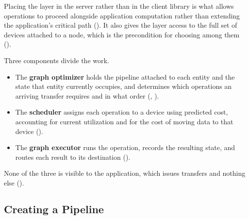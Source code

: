 Placing the layer in the server rather than in the client library is what allows operations to proceed alongside application computation rather than extending the application's critical path (). It also gives the layer access to the full set of devices attached to a node, which is the precondition for choosing among them ().

Three components divide the work.

\begin{itemize}
    \item The \textbf{graph optimizer} holds the pipeline attached to each entity and the state that entity currently occupies, and determines which operations an arriving transfer requires and in what order (, ).
    \item The \textbf{scheduler} assigns each operation to a device using predicted cost, accounting for current utilization and for the cost of moving data to that device ().
    \item The \textbf{graph executor} runs the operation, records the resulting state, and routes each result to its destination ().
\end{itemize}

None of the three is visible to the application, which issues transfers and nothing else ().


\subsection{Creating a Pipeline}
\label{sec:pipeline}

